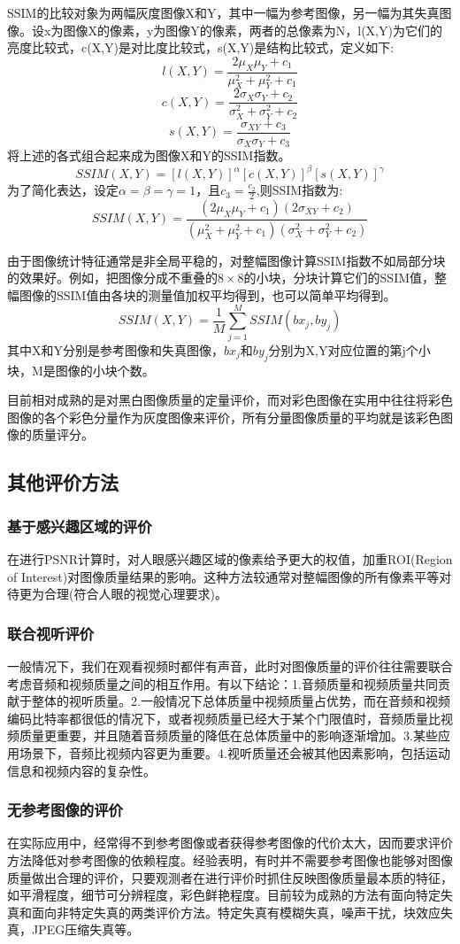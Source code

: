 \documentclass[11pt]{article}
\begin{document}
SSIM的比较对象为两幅灰度图像X和Y，其中一幅为参考图像，另一幅为其失真图像。设x为图像X的像素，y为图像Y的像素，两者的总像素为N，l(X,Y)为它们的亮度比较式，c(X,Y)是对比度比较式，s(X,Y)是结构比较式，定义如下:
$$l(X,Y)=\frac{2\mu_X\mu_Y+c_1}{\mu_X^2+\mu_Y^2+c_1}$$
$$c(X,Y)=\frac{2\sigma_X\sigma_Y+c_2}{\sigma_X^2+\sigma_Y^2+c_2}$$
$$s(X,Y)=\frac{\sigma_{XY}+c_3}{\sigma_X\sigma_Y+c_3}$$
将上述的各式组合起来成为图像X和Y的SSIM指数。
$$SSIM(X,Y)=[l(X,Y)]^{\alpha}[c(X,Y)]^{\beta}[s(X,Y)]^{\gamma}$$
为了简化表达，设定$\alpha =\beta = \gamma = 1$，且$c_3=\frac{c_2}{2}$,则SSIM指数为:
$$SSIM(X,Y)=\frac{(2\mu_X\mu_Y+c_1)(2\sigma_{XY}+c_2)}{(\mu_X^2+\mu_Y^2+c_1)(\sigma_X^2+\sigma_Y^2+c_2)}$$

由于图像统计特征通常是非全局平稳的，对整幅图像计算SSIM指数不如局部分块的效果好。例如，把图像分成不重叠的$8\times8$的小块，分块计算它们的SSIM值，整幅图像的SSIM值由各块的测量值加权平均得到，也可以简单平均得到。
$$SSIM(X,Y)=\frac{1}{M}\sum_{j=1}^{M}SSIM(bx_j,by_j)$$
其中X和Y分别是参考图像和失真图像，$bx_j$和$by_j$分别为X,Y对应位置的第j个小块，M是图像的小块个数。

目前相对成熟的是对黑白图像质量的定量评价，而对彩色图像在实用中往往将彩色图像的各个彩色分量作为灰度图像来评价，所有分量图像质量的平均就是该彩色图像的质量评分。

\subsection{其他评价方法}
\subsubsection{基于感兴趣区域的评价}
在进行PSNR计算时，对人眼感兴趣区域的像素给予更大的权值，加重ROI(Region of Interest)对图像质量结果的影响。这种方法较通常对整幅图像的所有像素平等对待更为合理(符合人眼的视觉心理要求)。
\subsubsection{联合视听评价}
一般情况下，我们在观看视频时都伴有声音，此时对图像质量的评价往往需要联合考虑音频和视频质量之间的相互作用。有以下结论：1.音频质量和视频质量共同贡献于整体的视听质量。2.一般情况下总体质量中视频质量占优势，而在音频和视频编码比特率都很低的情况下，或者视频质量已经大于某个门限值时，音频质量比视频质量更重要，并且随着音频质量的降低在总体质量中的影响逐渐增加。3.某些应用场景下，音频比视频内容更为重要。4.视听质量还会被其他因素影响，包括运动信息和视频内容的复杂性。
\subsubsection{无参考图像的评价}
在实际应用中，经常得不到参考图像或者获得参考图像的代价太大，因而要求评价方法降低对参考图像的依赖程度。经验表明，有时并不需要参考图像也能够对图像质量做出合理的评价，只要观测者在进行评价时抓住反映图像质量最本质的特征，如平滑程度，细节可分辨程度，彩色鲜艳程度。目前较为成熟的方法有面向特定失真和面向非特定失真的两类评价方法。特定失真有模糊失真，噪声干扰，块效应失真，JPEG压缩失真等。
\end{document}
